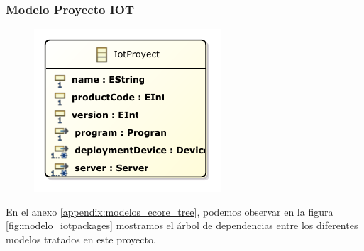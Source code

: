 \subsubsection{Modelo Proyecto IOT}

\begin{figure}[htp]
	\centering
    \includegraphics[height=0.2\textheight]{images/models/iotproyects_class_diagram.pdf}
    \label{fig:modelo_iotproyects_classes}
\end{figure}

En el anexo \ref{appendix:modelos_ecore_tree}, podemos observar en la figura \ref{fig:modelo_iotpackages} mostramos el árbol de dependencias entre los diferentes modelos tratados en este proyecto.
